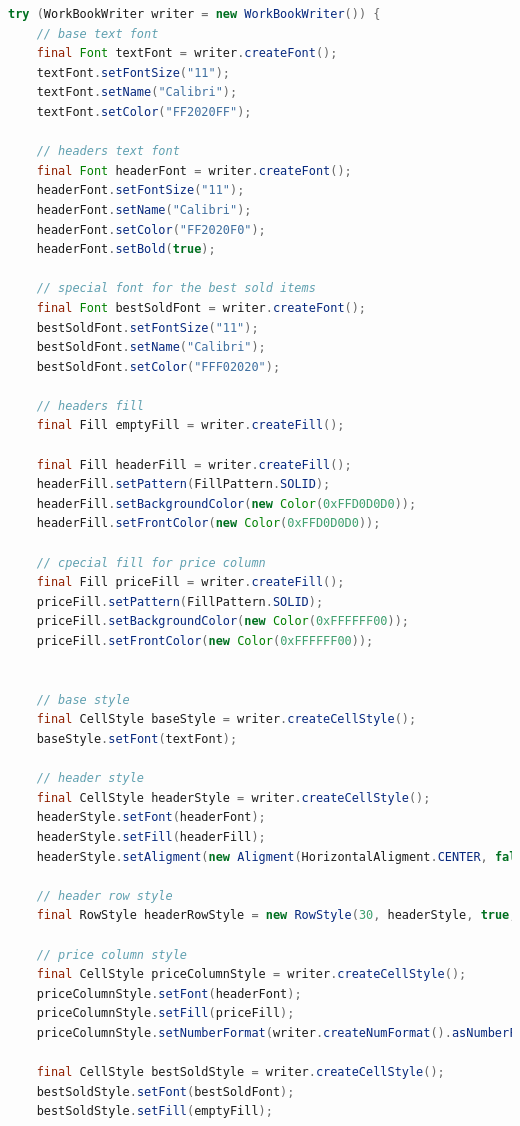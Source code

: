 \documentclass[14pt]{matmex-diploma}
\begin{document}
\begin{lstlisting}[language=Java, style=basic, caption={Пример создания документа XLSX с форматированием с помощью библиотеки oxml-doc}, captionpos=b, label=java2]
try (WorkBookWriter writer = new WorkBookWriter()) {
    // base text font
    final Font textFont = writer.createFont();
    textFont.setFontSize("11");
    textFont.setName("Calibri");
    textFont.setColor("FF2020FF");

    // headers text font
    final Font headerFont = writer.createFont();
    headerFont.setFontSize("11");
    headerFont.setName("Calibri");
    headerFont.setColor("FF2020F0");
    headerFont.setBold(true);

    // special font for the best sold items
    final Font bestSoldFont = writer.createFont();
    bestSoldFont.setFontSize("11");
    bestSoldFont.setName("Calibri");
    bestSoldFont.setColor("FFF02020");

    // headers fill
    final Fill emptyFill = writer.createFill();

    final Fill headerFill = writer.createFill();
    headerFill.setPattern(FillPattern.SOLID);
    headerFill.setBackgroundColor(new Color(0xFFD0D0D0));
    headerFill.setFrontColor(new Color(0xFFD0D0D0));

    // cpecial fill for price column
    final Fill priceFill = writer.createFill();
    priceFill.setPattern(FillPattern.SOLID);
    priceFill.setBackgroundColor(new Color(0xFFFFFF00));
    priceFill.setFrontColor(new Color(0xFFFFFF00));


    // base style
    final CellStyle baseStyle = writer.createCellStyle();
    baseStyle.setFont(textFont);

    // header style
    final CellStyle headerStyle = writer.createCellStyle();
    headerStyle.setFont(headerFont);
    headerStyle.setFill(headerFill);
    headerStyle.setAligment(new Aligment(HorizontalAligment.CENTER, false, VerticalAligment.CENTER));

    // header row style
    final RowStyle headerRowStyle = new RowStyle(30, headerStyle, true, true);

    // price column style
    final CellStyle priceColumnStyle = writer.createCellStyle();
    priceColumnStyle.setFont(headerFont);
    priceColumnStyle.setFill(priceFill);
    priceColumnStyle.setNumberFormat(writer.createNumFormat().asNumberFmt(2));

    final CellStyle bestSoldStyle = writer.createCellStyle();
    bestSoldStyle.setFont(bestSoldFont);
    bestSoldStyle.setFill(emptyFill);


\end{lstlisting}
\end{document}
